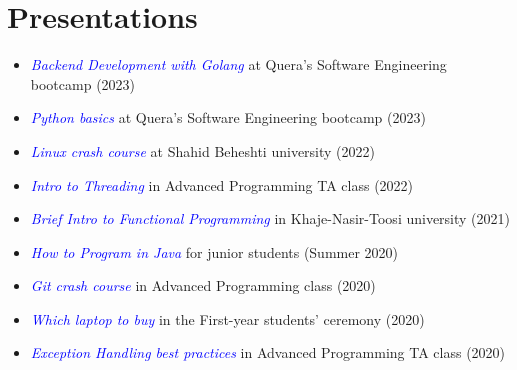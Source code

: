 \documentclass[11pt,a4paper,sans]{moderncv}
\begin{document}

\pagebreak
\section{Presentations}
\begin{itemize}
\item \textit{\textcolor{blue}{Backend Development with Golang}} at Quera's Software Engineering bootcamp (2023)
\item \textit{\textcolor{blue}{Python basics}} at Quera's Software Engineering bootcamp (2023)
\item \textit{\textcolor{blue}{Linux crash course}} at Shahid Beheshti university (2022)
\item \textit{\textcolor{blue}{Intro to Threading}} in Advanced Programming TA class (2022)
\item \textit{\textcolor{blue}{Brief Intro to Functional Programming}} in Khaje-Nasir-Toosi university (2021)
\item \textit{\textcolor{blue}{How to Program in Java}} for junior students (Summer 2020)
\item \textit{\textcolor{blue}{Git crash course}} in Advanced Programming class  (2020)
\item \textit{\textcolor{blue}{Which laptop to buy}} in the First-year students' ceremony (2020)
\item \textit{\textcolor{blue}{Exception Handling best practices}} in Advanced Programming TA class (2020)
\end{itemize}




\vspace{-0.4em}
\end{document}
